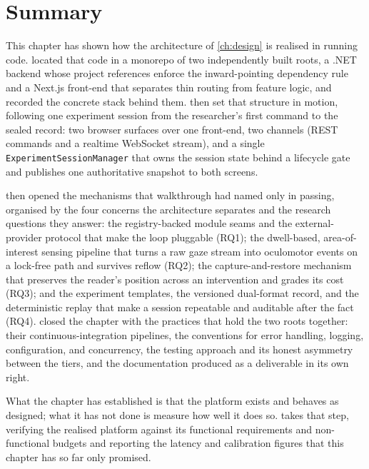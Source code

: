 \section{Summary}
\label{sec:impl-summary}

This chapter has shown how the architecture of \cref{ch:design} is realised in running code.
 located that code in a monorepo of two independently built roots, a .NET backend whose project references enforce the inward-pointing dependency rule and a Next.js front-end that separates thin routing from feature logic, and recorded the concrete stack behind them.
 then set that structure in motion, following one experiment session from the researcher's first command to the sealed record: two browser surfaces over one front-end, two channels (REST commands and a realtime WebSocket stream), and a single \texttt{ExperimentSessionManager} that owns the session state behind a lifecycle gate and publishes one authoritative snapshot to both screens.

 then opened the mechanisms that walkthrough had named only in passing, organised by the four concerns the architecture separates and the research questions they answer: the registry-backed module seams and the external-provider protocol that make the loop pluggable (RQ1); the dwell-based, area-of-interest sensing pipeline that turns a raw gaze stream into oculomotor events on a lock-free path and survives reflow (RQ2); the capture-and-restore mechanism that preserves the reader's position across an intervention and grades its cost (RQ3); and the experiment templates, the versioned dual-format record, and the deterministic replay that make a session repeatable and auditable after the fact (RQ4).
 closed the chapter with the practices that hold the two roots together: their continuous-integration pipelines, the conventions for error handling, logging, configuration, and concurrency, the testing approach and its honest asymmetry between the tiers, and the documentation produced as a deliverable in its own right.

What the chapter has established is that the platform exists and behaves as designed; what it has not done is measure how well it does so.
 takes that step, verifying the realised platform against its functional requirements and non-functional budgets and reporting the latency and calibration figures that this chapter has so far only promised.
